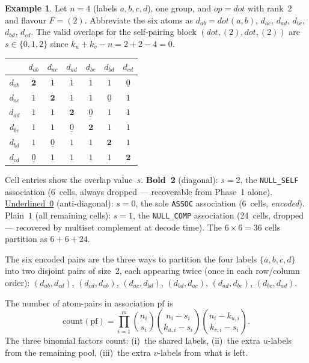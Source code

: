 \documentclass[11pt,a4paper]{article}
\theoremstyle{definition}
\newtheorem{example}[definition]{Example}
\theoremstyle{plain}
\theoremstyle{remark}
\newcommand{\pf}{\mathrm{pf}}
\newcommand{\acount}{\mathrm{count}}
\newcommand{\comb}[2]{\binom{#1}{#2}}
\begin{document}
\begin{example}
\label{ex:assoc-table}
Let $n=4$ (labels $a,b,c,d$), one group, and $\mathit{op}=\mathit{dot}$ with
rank~2 and flavour $F=(2)$.  Abbreviate the six atoms as $d_{ab}=\mathit{dot}(a,b)$,
$d_{ac}$, $d_{ad}$, $d_{bc}$, $d_{bd}$, $d_{cd}$.  The valid overlaps for the
self-pairing block $(\mathit{dot},(2),\mathit{dot},(2))$ are $s\in\{0,1,2\}$
since $k_u+k_v-n=2+2-4=0$.

\medskip
\begin{center}
\small
\renewcommand{\arraystretch}{1.4}
\begin{tabular}{c|cccccc}
  \toprule
  & $d_{ab}$ & $d_{ac}$ & $d_{ad}$ & $d_{bc}$ & $d_{bd}$ & $d_{cd}$ \\
  \midrule
  $d_{ab}$ & $\mathbf{2}$ & $1$ & $1$ & $1$ & $1$ & $\underline{0}$ \\
  $d_{ac}$ & $1$ & $\mathbf{2}$ & $1$ & $1$ & $\underline{0}$ & $1$ \\
  $d_{ad}$ & $1$ & $1$ & $\mathbf{2}$ & $\underline{0}$ & $1$ & $1$ \\
  $d_{bc}$ & $1$ & $1$ & $\underline{0}$ & $\mathbf{2}$ & $1$ & $1$ \\
  $d_{bd}$ & $1$ & $\underline{0}$ & $1$ & $1$ & $\mathbf{2}$ & $1$ \\
  $d_{cd}$ & $\underline{0}$ & $1$ & $1$ & $1$ & $1$ & $\mathbf{2}$ \\
  \bottomrule
\end{tabular}
\end{center}
\medskip

Cell entries show the overlap value~$s$.
\textbf{Bold~2} (diagonal): $s=2$, the \texttt{NULL\_SELF} association
(6~cells, always dropped — recoverable from Phase~1 alone).
\underline{Underlined~0} (anti-diagonal): $s=0$, the sole \texttt{ASSOC}
association (6~cells, \emph{encoded}).
Plain~$1$ (all remaining cells): $s=1$, the \texttt{NULL\_COMP} association
(24~cells, dropped — recovered by multiset complement at decode time).
The $6\times6=36$ cells partition as $6+6+24$.

The six encoded pairs are the three ways to partition the four labels
$\{a,b,c,d\}$ into two disjoint pairs of size~2, each appearing twice (once in
each row/column order): $(d_{ab},d_{cd})$, $(d_{cd},d_{ab})$,
$(d_{ac},d_{bd})$, $(d_{bd},d_{ac})$, $(d_{ad},d_{bc})$, $(d_{bc},d_{ad})$.
\end{example}

The number of atom-pairs in association $\pf$ is
\begin{equation}\label{eq:pf-count}
  \acount(\pf) = \prod_{i=1}^m \comb{n_i}{s_i}\comb{n_i-s_i}{k_{u,i}-s_i}
    \comb{n_i-k_{u,i}}{k_{v,i}-s_i}.
\end{equation}
The three binomial factors count: (i)~the shared labels, (ii)~the extra
$u$-labels from the remaining pool, (iii)~the extra $v$-labels from what is
left.
\end{document}
